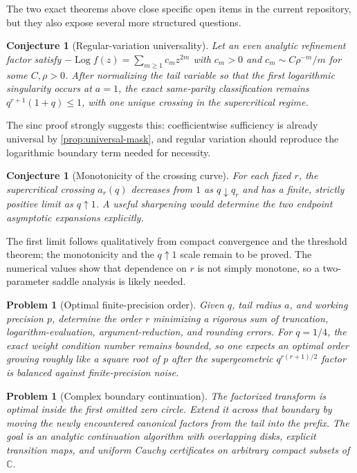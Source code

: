 \documentclass[11pt,oneside]{article}
\numberwithin{equation}{section}
\theoremstyle{frontier}
\newtheorem{conjecture}[theorem]{Conjecture}
\newtheorem{problem}[theorem]{Problem}
\theoremstyle{definition}
\theoremstyle{remark}
\newcommand{\Log}{\operatorname{Log}}
\newcommand{\C}{\mathbb C}
\begin{document}
The two exact theorems above close specific open items in the current repository, but they
also expose several more structured questions.

\begin{conjecture}[Regular-variation universality]\label{conj:regular-variation}
Let an even analytic refinement factor satisfy
$-\Log f(z)=\sum_{m\ge1}c_mz^{2m}$ with $c_m>0$ and
$c_m\sim C\rho^{-m}/m$ for some $C,\rho>0$.  After normalizing the tail variable so that the
first logarithmic singularity occurs at $a=1$, the exact same-parity classification remains
$q^{r+1}(1+q)\le1$, with one unique crossing in the supercritical regime.
\end{conjecture}

The sinc proof strongly suggests this: coefficientwise sufficiency is already universal by
\cref{prop:universal-mask}, and regular variation should reproduce the logarithmic boundary
term needed for necessity.

\begin{conjecture}[Monotonicity of the crossing curve]\label{conj:crossing-curve}
For each fixed $r$, the supercritical crossing $a_r(q)$ decreases from $1$ as
$q\downarrow q_r$ and has a finite, strictly positive limit as $q\uparrow1$.  A useful
sharpening would determine the two endpoint asymptotic expansions explicitly.
\end{conjecture}

The first limit follows qualitatively from compact convergence and the threshold theorem;
the monotonicity and the $q\uparrow1$ scale remain to be proved.  The numerical values show
that dependence on $r$ is not simply monotone, so a two-parameter saddle analysis is likely
needed.

\begin{problem}[Optimal finite-precision order]\label{prob:finite-precision}
Given $q$, tail radius $a$, and working precision $p$, determine the order $r$ minimizing a
rigorous sum of truncation, logarithm-evaluation, argument-reduction, and rounding errors.
For $q=1/4$, the exact weight condition number remains bounded, so one expects an optimal
order growing roughly like a square root of $p$ after the supergeometric
$q^{r(r+1)/2}$ factor is balanced against finite-precision noise.
\end{problem}

\begin{problem}[Complex boundary continuation]\label{prob:complex-boundary}
The factorized transform is optimal inside the first omitted zero circle.  Extend it across
that boundary by moving the newly encountered canonical factors from the tail into the
prefix.  The goal is an analytic continuation algorithm with overlapping disks, explicit
transition maps, and uniform Cauchy certificates on arbitrary compact subsets of $\C$.
\end{problem}
\end{document}
